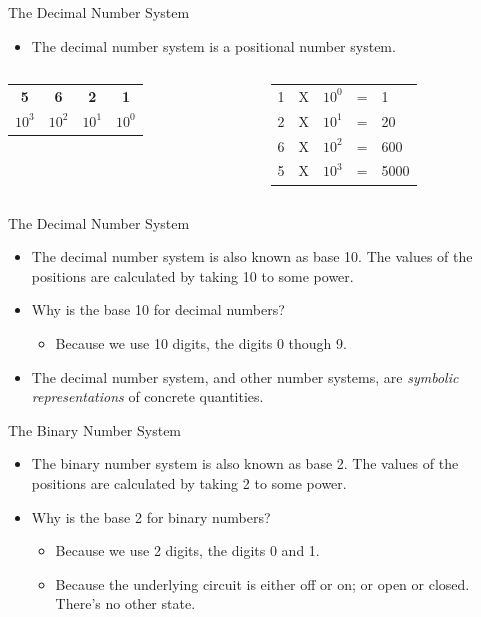\documentclass[graphics]{beamer}
\newcommand*{\thead}[1]{\multicolumn{1}{c}{\bfseries #1}}
\begin{document}
\begin{frame}{The Decimal Number System}
    \begin{itemize}
        \item The decimal number system is a positional number system.
    \end{itemize}
    
    \begin{columns}
            \begin{tabular}{ c c c c }
                \thead{5} & \thead{6} & \thead{2} & \thead{1} \\ 
                $10^3$ & $10^2$ & $10^1$ & $10^0$
            \end{tabular}
            \begin{tabular}{ l l l l l }
                1 & X & $10^0$ & = & 1 \\ 
                2 & X & $10^1$ & = & 20 \\
                6 & X & $10^2$ & = & 600 \\
                5 & X & $10^3$ & = & 5000
            \end{tabular}
    \end{columns}
\end{frame}

\begin{frame}{The Decimal Number System}
    \begin{itemize}
        \item The decimal number system is also known as base 10. The values of the positions are calculated by taking 10 to some power.
        \item Why is the base 10 for decimal numbers?
        \begin{itemize}
            \item Because we use 10 digits, the digits 0 though 9.
        \end{itemize}
        \item The decimal number system, and other number systems, are \textit{symbolic representations} of concrete quantities.
    \end{itemize}
\end{frame}

\begin{frame}{The Binary Number System}
    \begin{itemize}
        \item The binary number system is also known as base 2. The values of the positions are calculated by taking 2 to some power.
        \item Why is the base 2 for binary numbers?
        \begin{itemize}
            \item Because we use 2 digits, the digits 0 and 1.
            \item Because the underlying circuit is either off or on; or open or closed. There's no other state.
        \end{itemize}
    \end{itemize}
\end{frame}
\end{document}
